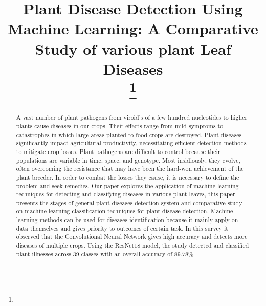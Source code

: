 \documentclass[conference]{IEEEtran}
\begin{document}
\title{Plant Disease Detection Using Machine Learning: A Comparative Study of various plant Leaf Diseases\\
{\footnotesize \textsuperscript{}}
\thanks{}
}

\author{
    \and
    \and
}


\maketitle

\begin{abstract}
A vast number of plant pathogens from viroid’s of a few hundred nucleotides to higher plants cause diseases in our crops. Their effects range from mild symptoms to catastrophes in which large areas planted to food crops are destroyed. Plant diseases significantly impact agricultural productivity, necessitating efficient detection methods to mitigate crop losses. Plant pathogens are difficult to control because their populations are variable in time, space, and genotype. Most insidiously, they evolve, often overcoming the resistance that may have been the hard-won achievement of the plant breeder. In order to combat the losses they cause, it is necessary to define the problem and seek remedies. Our paper explores the application of machine learning techniques for detecting and classifying diseases in various plant leaves, this paper presents the stages of general plant diseases detection system and comparative study on machine learning classification techniques for plant disease detection. Machine learning methods can be used for diseases identification because it mainly apply on data themselves and gives priority to outcomes of certain task. In this survey it observed that the Convolutional Neural Network gives high accuracy and detects more diseases of multiple crops.
Using the ResNet18 model, the study detected and classified plant illnesses across 39 classes with an overall accuracy of 89.78\%. 




\end{abstract}
\end{document}
